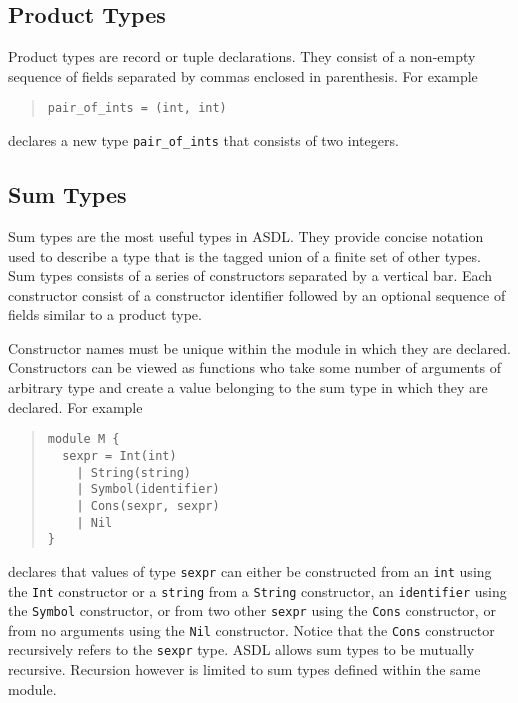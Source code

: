 \subsection{Product Types}
Product types are record or tuple declarations. They consist of a non-empty 
sequence of fields separated by commas enclosed in parenthesis. For
example 
\begin{quote}\begin{lstlisting}[language=ASDL] 
pair_of_ints = (int, int) 
\end{lstlisting}\end{quote}%
declares a new type \lstinline[language=ASDL]!pair_of_ints! that consists of two integers.

\subsection{Sum Types}

Sum types are the most useful types in ASDL. They provide concise notation
used to describe a type that is the tagged union of a finite set of other
types.  Sum types consists of a series of constructors separated by a
vertical bar. Each constructor consist of a constructor identifier followed
by an optional sequence of fields similar to a product type. 

Constructor names must be unique within the module in which they are
declared. Constructors can be viewed as functions who take some number of
arguments of arbitrary type and create a value belonging to the sum type in
which they are declared. For example
\begin{quote}\begin{lstlisting}[language=ASDL]
module M {
  sexpr = Int(int)
	| String(string)
	| Symbol(identifier)
	| Cons(sexpr, sexpr)
	| Nil
}
\end{lstlisting}\end{quote}%
declares that values of type \lstinline[language=ASDL]!sexpr! can either be constructed from an
\lstinline[language=ASDL]!int! using the \lstinline[language=ASDL]!Int! constructor or a \lstinline[language=ASDL]!string! from a \lstinline[language=ASDL]!String!
constructor, an \lstinline[language=ASDL]!identifier! using the \lstinline[language=ASDL]!Symbol! constructor, or from
two other \lstinline[language=ASDL]!sexpr! using the \lstinline[language=ASDL]!Cons! constructor, or from no arguments
using the \lstinline[language=ASDL]!Nil! constructor. Notice that the \lstinline[language=ASDL]!Cons! constructor
recursively refers to the \lstinline[language=ASDL]!sexpr! type. ASDL allows sum types to be
mutually recursive. Recursion however is limited to sum types defined within
the same module.

